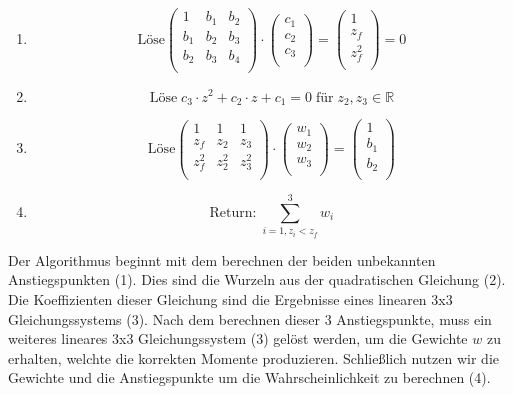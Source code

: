 \documentclass[runningheaders,a4paper]{llncs}
\begin{document}
\begin{enumerate}
\item $$\text{Löse}
\begin{pmatrix}
1 & b_1 & b_2\\
b_1 & b_2 & b_3\\
b_2 & b_3 & b_4\\
\end{pmatrix} \cdot
\begin{pmatrix} 
c_1\\
c_2\\
c_3\\
\end{pmatrix}  =
\begin{pmatrix}
1\\
z_f\\
z^2_f\\
\end{pmatrix} = 0
$$
\item $$\text{Löse} \;
c_3 \cdot z^2 + c_2 \cdot z + c_1 = 0\; \text{für} \; z_2,z_3 \in \mathbb{R} 
$$
\item $$ \text{Löse}
\begin{pmatrix}
1 & 1 & 1\\
z_f & z_2 & z_3\\
z^2_f & z^2_2 & z^2_3\\
\end{pmatrix} \cdot
\begin{pmatrix} 
w_1\\
w_2\\
w_3\\
\end{pmatrix}  =
\begin{pmatrix}
1\\
b_1\\
b_2\\
\end{pmatrix}
$$
\item 
$$
\text{Return:} \;
\sum_{i=1,z_i<z_f}^{3} w_{i}
$$
\end{enumerate}

Der Algorithmus beginnt mit dem berechnen der beiden unbekannten Anstiegspunkten (1).
Dies sind die Wurzeln aus der quadratischen Gleichung (2). Die Koeffizienten dieser Gleichung sind die Ergebnisse eines linearen 3x3 Gleichungssystems (3).
Nach dem berechnen dieser 3 Anstiegspunkte, muss ein weiteres lineares 3x3 Gleichungssystem (3) gelöst werden, um die Gewichte $w$ zu erhalten, welchte die korrekten Momente produzieren. Schließlich nutzen wir die Gewichte und die Anstiegspunkte um die Wahrscheinlichkeit zu berechnen (4).\cite{msm}
\end{document}

